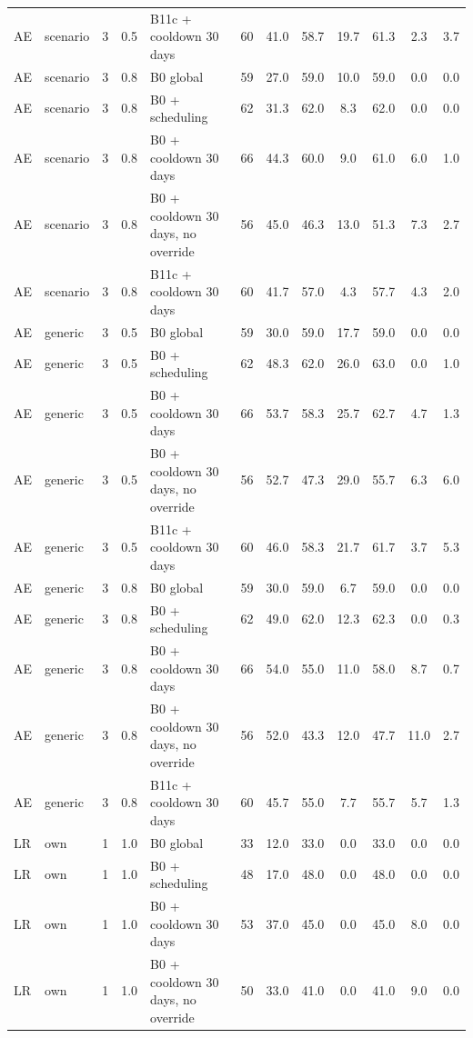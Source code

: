 \documentclass[10pt,onecolumn,letterpaper]{article}
\begin{document}
\begin{longtable}{lllllccccccc}
AE & scenario & 3 & 0.5 & B11c + cooldown 30 days & 60 & 41.0 & 58.7 & 19.7 & 61.3 & 2.3 & 3.7 \\
AE & scenario & 3 & 0.8 & B0 global & 59 & 27.0 & 59.0 & 10.0 & 59.0 & 0.0 & 0.0 \\
AE & scenario & 3 & 0.8 & B0 + scheduling & 62 & 31.3 & 62.0 & 8.3 & 62.0 & 0.0 & 0.0 \\
AE & scenario & 3 & 0.8 & B0 + cooldown 30 days & 66 & 44.3 & 60.0 & 9.0 & 61.0 & 6.0 & 1.0 \\
AE & scenario & 3 & 0.8 & B0 + cooldown 30 days, no override & 56 & 45.0 & 46.3 & 13.0 & 51.3 & 7.3 & 2.7 \\
AE & scenario & 3 & 0.8 & B11c + cooldown 30 days & 60 & 41.7 & 57.0 & 4.3 & 57.7 & 4.3 & 2.0 \\
AE & generic & 3 & 0.5 & B0 global & 59 & 30.0 & 59.0 & 17.7 & 59.0 & 0.0 & 0.0 \\
AE & generic & 3 & 0.5 & B0 + scheduling & 62 & 48.3 & 62.0 & 26.0 & 63.0 & 0.0 & 1.0 \\
AE & generic & 3 & 0.5 & B0 + cooldown 30 days & 66 & 53.7 & 58.3 & 25.7 & 62.7 & 4.7 & 1.3 \\
AE & generic & 3 & 0.5 & B0 + cooldown 30 days, no override & 56 & 52.7 & 47.3 & 29.0 & 55.7 & 6.3 & 6.0 \\
AE & generic & 3 & 0.5 & B11c + cooldown 30 days & 60 & 46.0 & 58.3 & 21.7 & 61.7 & 3.7 & 5.3 \\
AE & generic & 3 & 0.8 & B0 global & 59 & 30.0 & 59.0 & 6.7 & 59.0 & 0.0 & 0.0 \\
AE & generic & 3 & 0.8 & B0 + scheduling & 62 & 49.0 & 62.0 & 12.3 & 62.3 & 0.0 & 0.3 \\
AE & generic & 3 & 0.8 & B0 + cooldown 30 days & 66 & 54.0 & 55.0 & 11.0 & 58.0 & 8.7 & 0.7 \\
AE & generic & 3 & 0.8 & B0 + cooldown 30 days, no override & 56 & 52.0 & 43.3 & 12.0 & 47.7 & 11.0 & 2.7 \\
AE & generic & 3 & 0.8 & B11c + cooldown 30 days & 60 & 45.7 & 55.0 & 7.7 & 55.7 & 5.7 & 1.3 \\
LR & own & 1 & 1.0 & B0 global & 33 & 12.0 & 33.0 & 0.0 & 33.0 & 0.0 & 0.0 \\
LR & own & 1 & 1.0 & B0 + scheduling & 48 & 17.0 & 48.0 & 0.0 & 48.0 & 0.0 & 0.0 \\
LR & own & 1 & 1.0 & B0 + cooldown 30 days & 53 & 37.0 & 45.0 & 0.0 & 45.0 & 8.0 & 0.0 \\
LR & own & 1 & 1.0 & B0 + cooldown 30 days, no override & 50 & 33.0 & 41.0 & 0.0 & 41.0 & 9.0 & 0.0 \\

\end{longtable}
\end{document}
